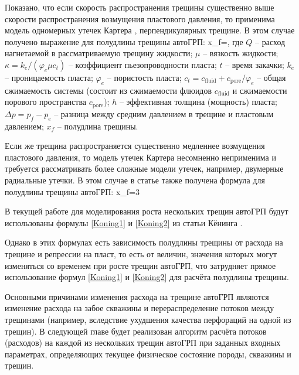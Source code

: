 Показано, что если скорость распространения трещины существенно выше скорости распространения возмущения пластового давления, то применима модель одномерных утечек Картера \cite{karter}, перпендикулярных трещине.
В этом случае получено выражение для полудлины трещины автоГРП:
\beq\label{Koning1}
x_{\!f}=,
\eeq
где $Q$ -- расход нагнетаемой в рассматриваемую трещину жидкости;
$\mu$ -- вязкость жидкости;
$\kappa=k_e/(\varphi_e\mu c_t)$ -- коэффициент пьезопроводности пласта;
$t$ -- время закачки;
$k_e$ -- проницаемость пласта;
$\varphi_e$ -- пористость пласта;\newline
$c_t=c_{\text{fluid}}+c_{\text{pore}}/\varphi_e$ -- общая сжимаемость системы (состоит из сжимаемости флюидов $c_{\text{fluid}}$ и сжимаемости порового пространства $c_{\text{pore}}$);
$h$ -- эффективная толщина (мощность) пласта;
$\Delta p=p_{\!f}-p_e$ -- разница между средним давлением в трещине и пластовым давлением; $x_{\!f}$ -- полудлина трещины.

Если же трещина распространяется существенно медленнее возмущения пластового давления, то модель утечек Картера несомненно неприменима и требуется рассматривать более сложные модели утечек, например, двумерные радиальные утечки.
В этом случае в статье \cite{koning} также получена формула для полудлины трещины автоГРП:
\beq\label{Koning2}
x_{\!f}=3
\eeq

В текущей работе для моделирования роста нескольких трещин автоГРП будут использованы формулы \eqref{Koning1} и \eqref{Koning2} из статьи Кёнинга \cite{koning}.

Однако в этих формулах есть зависимость полудлины трещины от расхода на трещине и репрессии на пласт, то есть от величин, значения которых могут изменяться со временем при росте трещин автоГРП, что затрудняет прямое использование формул \eqref{Koning1} и \eqref{Koning2} для расчёта полудлины трещины.

Основными причинами изменения расхода на трещине автоГРП являются изменение расхода на забое скважины и перераспределение потоков между трещинами (например, вследствие ухудшения качества перфораций на одной из трещин).
В следующей главе будет реализован алгоритм расчёта потоков (расходов) на каждой из нескольких трещин автоГРП при заданных входных параметрах, определяющих текущее физическое состояние породы, скважины и трещин.




